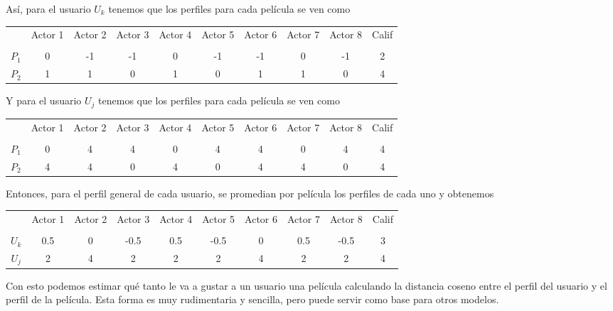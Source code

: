 Así, para el usuario $U_k$ tenemos que los perfiles para cada película se ven como

\begin{center}
\begin{tabular}{ c | c  c c c c c c c c}
    & Actor 1 & Actor 2 & Actor 3 & Actor 4 & Actor 5 & Actor 6 & Actor 7 & Actor 8 & Calif \\ \\
  \hline                       
$P_1$ & 0 & -1 & -1 & 0 & -1 & -1 & 0 & -1 & 2 \\
$P_2$ & 1 & 1 & 0 & 1 & 0 & 1 & 1 & 0 & 4 \\
  \hline  
\end{tabular}
\end{center}

Y para el usuario $U_j$ tenemos que los perfiles para cada película se ven como

\begin{center}
\begin{tabular}{ c | c  c c c c c c c c}
    & Actor 1 & Actor 2 & Actor 3 & Actor 4 & Actor 5 & Actor 6 & Actor 7 & Actor 8 & Calif \\ \\
  \hline                       
$P_1$ & 0 & 4 & 4 & 0 & 4 & 4 & 0 & 4 & 4 \\
$P_2$ & 4 & 4 & 0 & 4 & 0 & 4 & 4 & 0 & 4 \\
  \hline  
\end{tabular}
\end{center}

Entonces, para el perfil general de cada usuario, se promedian por película los perfiles de cada uno y obtenemos

\begin{center}
\begin{tabular}{ c | c  c c c c c c c c}
    & Actor 1 & Actor 2 & Actor 3 & Actor 4 & Actor 5 & Actor 6 & Actor 7 & Actor 8 & Calif \\ \\
  \hline                       
$U_k$ & 0.5 & 0 & -0.5 & 0.5 & -0.5 & 0 & 0.5 & -0.5 & 3 \\
$U_j$ & 2 & 4 & 2 & 2 & 2 & 4 & 2 & 2 & 4 \\
  \hline  
\end{tabular}
\end{center}

Con esto podemos estimar qué tanto le va a gustar a un usuario una película calculando la distancia coseno entre el perfil del usuario y el perfil de la película. Esta forma es muy rudimentaria y sencilla, pero puede servir como base para otros modelos.

